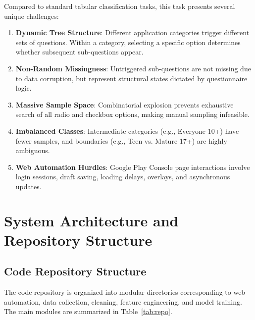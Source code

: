 \documentclass[11pt,a4paper]{article}
\begin{document}
Compared to standard tabular classification tasks, this task presents several unique challenges:
\begin{enumerate}[leftmargin=2em]
  \item \textbf{Dynamic Tree Structure}: Different application categories trigger different sets of questions. Within a category, selecting a specific option determines whether subsequent sub-questions appear.
  \item \textbf{Non-Random Missingness}: Untriggered sub-questions are not missing due to data corruption, but represent structural states dictated by questionnaire logic.
  \item \textbf{Massive Sample Space}: Combinatorial explosion prevents exhaustive search of all radio and checkbox options, making manual sampling infeasible.
  \item \textbf{Imbalanced Classes}: Intermediate categories (e.g., Everyone 10+) have fewer samples, and boundaries (e.g., Teen vs. Mature 17+) are highly ambiguous.
  \item \textbf{Web Automation Hurdles}: Google Play Console page interactions involve login sessions, draft saving, loading delays, overlays, and asynchronous updates.
\end{enumerate}

\section{System Architecture and Repository Structure}

\subsection{Code Repository Structure}

The code repository is organized into modular directories corresponding to web automation, data collection, cleaning, feature engineering, and model training. The main modules are summarized in Table~\ref{tab:repo}.
\end{document}
